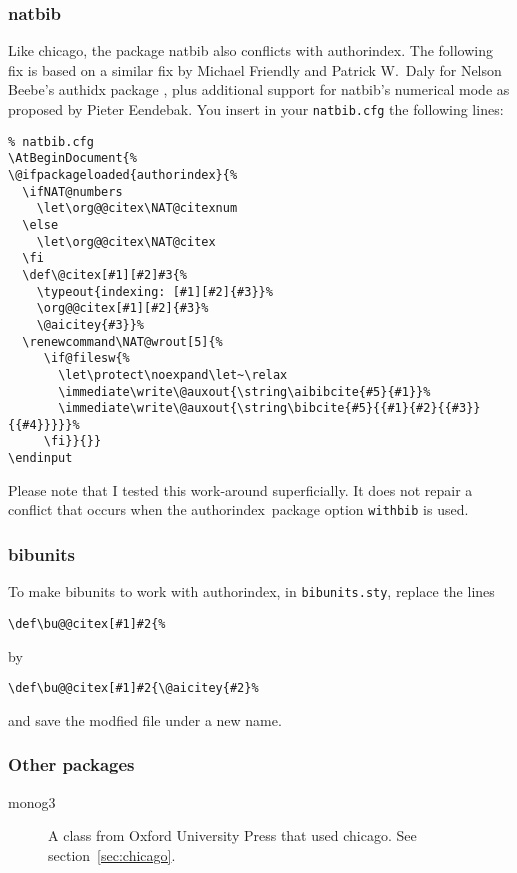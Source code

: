 \documentclass[a4paper]{article}
\newcommand{\package}[1]{\textsf{#1}}
\newcommand{\authorindex}{\package{authorindex}}
\newcommand{\file}[1]{\texttt{#1}}
\newcommand{\ltxinp}[1]{\texttt{\string#1}}
\begin{document}
\subsubsection{\package{natbib}}

Like \package{chicago}, the package \package{natbib} also conflicts with
\authorindex.  The following fix is based on a similar fix by Michael Friendly
and Patrick W.\ Daly for Nelson Beebe's \package{authidx} package
\cite{Beebe98}, plus additional support for \package{natbib}'s numerical mode
as proposed by Pieter Eendebak.  You insert in your \file{natbib.cfg} the
following lines:
\begin{verbatim}
% natbib.cfg
\AtBeginDocument{%
\@ifpackageloaded{authorindex}{%
  \ifNAT@numbers
    \let\org@@citex\NAT@citexnum
  \else
    \let\org@@citex\NAT@citex
  \fi
  \def\@citex[#1][#2]#3{%
    \typeout{indexing: [#1][#2]{#3}}%
    \org@@citex[#1][#2]{#3}%
    \@aicitey{#3}}%
  \renewcommand\NAT@wrout[5]{%
     \if@filesw{%
       \let\protect\noexpand\let~\relax
       \immediate\write\@auxout{\string\aibibcite{#5}{#1}}%
       \immediate\write\@auxout{\string\bibcite{#5}{{#1}{#2}{{#3}}{{#4}}}}}%
     \fi}}{}}
\endinput
\end{verbatim}
Please note that I tested this work-around superficially.  It does not repair a
conflict that occurs when the \authorindex\ package option \ltxinp{withbib} is
used.

\subsubsection{\package{bibunits}}

To make \package{bibunits} to work with \authorindex, in \file{bibunits.sty},
replace the lines
\begin{verbatim}
\def\bu@@citex[#1]#2{%
\end{verbatim}
by
\begin{verbatim}
\def\bu@@citex[#1]#2{\@aicitey{#2}%
\end{verbatim}
and save the modfied file under a new name.


\subsubsection{Other packages}

\begin{description}
\item[\package{monog3}] A class from Oxford University Press that used
  \package{chicago}.  See section~\ref{sec:chicago}.
\end{description}
\end{document}

